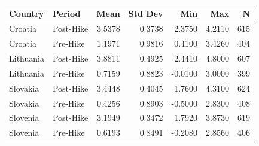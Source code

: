 \begin{tabular}{llrrrrr}
\toprule
Country & Period & Mean & Std Dev & Min & Max & N \\
\midrule
Croatia & Post-Hike & 3.5378 & 0.3738 & 2.3750 & 4.2110 & 615 \\
Croatia & Pre-Hike & 1.1971 & 0.9816 & 0.4100 & 3.4260 & 404 \\
Lithuania & Post-Hike & 3.8811 & 0.4925 & 2.4410 & 4.8000 & 607 \\
Lithuania & Pre-Hike & 0.7159 & 0.8823 & -0.0100 & 3.0000 & 399 \\
Slovakia & Post-Hike & 3.4448 & 0.4045 & 1.7600 & 4.3100 & 624 \\
Slovakia & Pre-Hike & 0.4256 & 0.8903 & -0.5000 & 2.8300 & 408 \\
Slovenia & Post-Hike & 3.1949 & 0.3472 & 1.7920 & 3.8730 & 619 \\
Slovenia & Pre-Hike & 0.6193 & 0.8491 & -0.2080 & 2.8560 & 406 \\
\bottomrule
\end{tabular}
